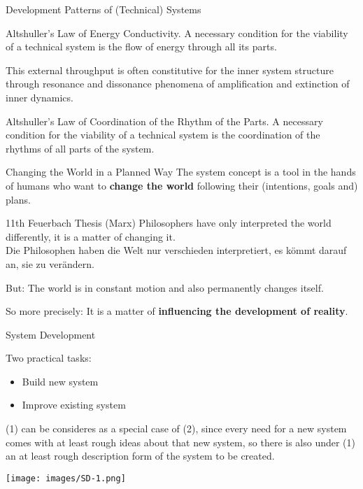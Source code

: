 \documentclass{beamer}
\begin{document}
\begin{frame}{Development Patterns of (Technical) Systems}

\begin{block}{Altshuller's Law of Energy Conductivity.}
  A necessary condition for the viability of a technical system is the flow of
  energy through all its parts.
\end{block}

This external throughput is often constitutive for the inner system structure
through resonance and dissonance phenomena of amplification and extinction of
inner dynamics.

\begin{block}{Altshuller's Law of Coordination of the Rhythm of the Parts.}
  A necessary condition for the viability of a technical system is the
  coordination of the rhythms of all parts of the system.
\end{block}
\end{frame}

\begin{frame}{Changing the World in a Planned Way}
The system concept is a tool in the hands of humans who want to \textbf{change
  the world} following their (intentions, goals and) plans.

\begin{block}{11th Feuerbach Thesis (Marx)}
  Philosophers have only interpreted the world differently, it is a matter of
  changing it.\\[4pt] Die Philosophen haben die Welt nur verschieden
  interpretiert, es kömmt darauf an, sie zu verändern.
\end{block}

But: The world is in constant motion and also permanently changes itself.

So more precisely: It is a matter of \textbf{influencing the development of
  reality}.
\end{frame}

\begin{frame}{System Development}

Two practical tasks:
\begin{itemize}
\item[(1)] Build new system
\item[(2)] Improve existing system
\end{itemize}

(1) can be consideres as a special case of (2), since every need for a new
system comes with at least rough ideas about that new system, so there is also
under (1) an at least rough description form of the system to be created.

\begin{center}
  \texttt{[image: images/SD-1.png]}
\end{center}
\end{frame}
\end{document}
